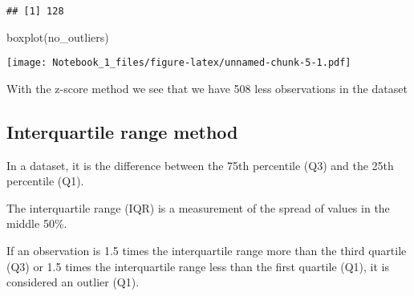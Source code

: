 \documentclass[
]{article}
\newenvironment{Shaded}{\begin{snugshade}}{\end{snugshade}}
\newcommand{\AttributeTok}[1]{\textcolor[rgb]{0.77,0.63,0.00}{#1}}
\newcommand{\CommentTok}[1]{\textcolor[rgb]{0.56,0.35,0.01}{\textit{#1}}}
\newcommand{\ControlFlowTok}[1]{\textcolor[rgb]{0.13,0.29,0.53}{\textbf{#1}}}
\newcommand{\FloatTok}[1]{\textcolor[rgb]{0.00,0.00,0.81}{#1}}
\newcommand{\FunctionTok}[1]{\textcolor[rgb]{0.00,0.00,0.00}{#1}}
\newcommand{\NormalTok}[1]{#1}
\newcommand{\OtherTok}[1]{\textcolor[rgb]{0.56,0.35,0.01}{#1}}
\newcommand{\SpecialCharTok}[1]{\textcolor[rgb]{0.00,0.00,0.00}{#1}}
\newcommand{\StringTok}[1]{\textcolor[rgb]{0.31,0.60,0.02}{#1}}
\begin{document}
\begin{verbatim}
## [1] 128
\end{verbatim}

\begin{Shaded}
\begin{Highlighting}[]
\FunctionTok{boxplot}\NormalTok{(no\_outliers)}
\end{Highlighting}
\end{Shaded}

\texttt{[image: Notebook\_1\_files/figure-latex/unnamed-chunk-5-1.pdf]}

With the z-score method we see that we have 508 less observations in the
dataset

\hypertarget{interquartile-range-method}{%
\subsection{Interquartile range
method}\label{interquartile-range-method}}

In a dataset, it is the difference between the 75th percentile (Q3) and
the 25th percentile (Q1).

The interquartile range (IQR) is a measurement of the spread of values
in the middle 50\%.

If an observation is 1.5 times the interquartile range more than the
third quartile (Q3) or 1.5 times the interquartile range less than the
first quartile (Q1), it is considered an outlier (Q1).

\begin{Shaded}
\end{Shaded}
\end{document}
